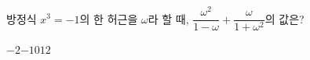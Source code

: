 방정식 $x^3=-1$의 한 허근을 $\omega$라 할 때, $\dfrac{\omega^2}{1-\omega}+\dfrac{\omega}{1+\omega^2}$의 값은?
\begin{choices32}{$-2$}{$-1$}{$0$}{$1$}{$2$}\end{choices32}
